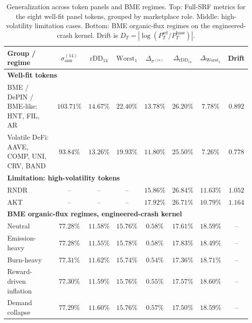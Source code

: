 \documentclass[a4paper,fleqn]{cas-dc}
\begin{document}
\begin{table}[t]
\centering
\caption{Generalization across token panels and BME regimes. Top: Full-SRF metrics for the eight well-fit panel tokens, grouped by marketplace role. Middle: high-volatility limitation cases. Bottom: BME organic-flux regimes on the engineered-crash kernel. Drift is \(D_T=|\log(P_T^{\mathrm{srf}}/P_T^{\mathrm{base}})|\).}
\label{tab:group_results}
\begin{tabular}{|l|c|c|c|c|c|c|c|}
\hline
\textbf{Group / regime} & \(\sigma_{\mathrm{ann}}^{(14)}\) & \(\mathrm{rDD}_{14}\) & \(\mathrm{Worst}_1\) & \(\Delta_{\sigma^{(14)}}\) & \(\Delta_{\mathrm{rDD}_{14}}\) & \(\Delta_{\mathrm{Worst}_1}\) & Drift \\
\hline
\multicolumn{8}{|l|}{\textbf{Well-fit tokens}} \\
\hline
BME / DePIN / BME-like: HNT, FIL, AR & \(103.71\%\) & \(14.67\%\) & \(22.40\%\) & \(13.78\%\) & \(26.20\%\) & \(7.78\%\) & \(0.892\) \\
\hline
Volatile DeFi: AAVE, COMP, UNI, CRV, BAND & \(93.84\%\) & \(13.26\%\) & \(19.93\%\) & \(11.80\%\) & \(25.50\%\) & \(7.26\%\) & \(0.778\) \\
\hline
\multicolumn{8}{|l|}{\textbf{Limitation: high-volatility tokens}} \\
\hline
RNDR & -- & -- & -- & \(15.86\%\) & \(26.84\%\) & \(11.63\%\) & \(1.052\) \\
\hline
AKT & -- & -- & -- & \(17.92\%\) & \(26.71\%\) & \(10.79\%\) & \(1.164\) \\
\hline
\multicolumn{8}{|l|}{\textbf{BME organic-flux regimes, engineered-crash kernel}} \\
\hline
Neutral & \(77.28\%\) & \(11.58\%\) & \(15.76\%\) & \(0.58\%\) & \(17.61\%\) & \(18.59\%\) & -- \\
\hline
Emission-heavy & \(77.28\%\) & \(11.55\%\) & \(15.78\%\) & \(0.58\%\) & \(17.83\%\) & \(18.49\%\) & -- \\
\hline
Burn-heavy & \(77.31\%\) & \(11.62\%\) & \(15.74\%\) & \(0.54\%\) & \(17.36\%\) & \(18.71\%\) & -- \\
\hline
Reward-driven inflation & \(77.30\%\) & \(11.59\%\) & \(15.76\%\) & \(0.55\%\) & \(17.57\%\) & \(18.60\%\) & -- \\
\hline
Demand collapse & \(77.29\%\) & \(11.60\%\) & \(15.76\%\) & \(0.57\%\) & \(17.50\%\) & \(18.59\%\) & -- \\
\hline
\end{tabular}
\end{table}
\end{document}
